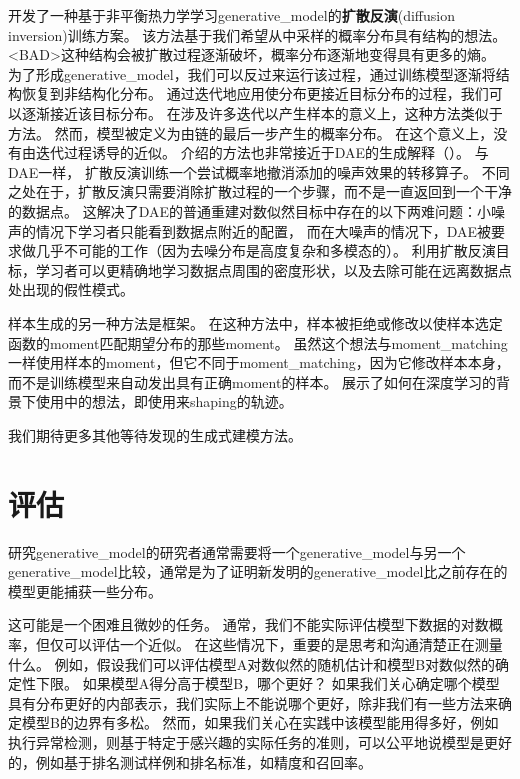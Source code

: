 \citet{Sohl-Dickstein-et-al-ICML2015} 开发了一种基于非平衡热力学学习\gls{generative_model}的\textbf{扩散反演}(diffusion inversion)训练方案。
该方法基于我们希望从中采样的概率分布具有结构的想法。
<BAD>这种结构会被扩散过程逐渐破坏，概率分布逐渐地变得具有更多的熵。
为了形成\gls{generative_model}，我们可以反过来运行该过程，通过训练模型逐渐将结构恢复到非结构化分布。
通过迭代地应用使分布更接近目标分布的过程，我们可以逐渐接近该目标分布。
在涉及许多迭代以产生样本的意义上，这种方法类似于方法。
然而，模型被定义为由链的最后一步产生的概率分布。
在这个意义上，没有由迭代过程诱导的近似。
\citet{Sohl-Dickstein-et-al-ICML2015} 介绍的方法也非常接近于\gls{DAE}的生成解释（）。
与\gls{DAE}一样， 扩散反演训练一个尝试概率地撤消添加的噪声效果的转移算子。
不同之处在于，扩散反演只需要消除扩散过程的一个步骤，而不是一直返回到一个干净的数据点。
这解决了\gls{DAE}的普通重建对数似然目标中存在的以下两难问题：小噪声的情况下学习者只能看到数据点附近的配置， 而在大噪声的情况下，\gls{DAE}被要求做几乎不可能的工作（因为去噪分布是高度复杂和多模态的）。
利用扩散反演目标，学习者可以更精确地学习数据点周围的密度形状，以及去除可能在远离数据点处出现的假性模式。

样本生成的另一种方法是框架\citep{rubin1984bayesianly}。
在这种方法中，样本被拒绝或修改以使样本选定函数的\gls{moment}匹配期望分布的那些\gls{moment}。
虽然这个想法与\gls{moment_matching}一样使用样本的\gls{moment}，但它不同于\gls{moment_matching}，因为它修改样本本身，而不是训练模型来自动发出具有正确\gls{moment}的样本。
\citet{BachmanP15} 展示了如何在深度学习的背景下使用中的想法，即使用来\gls{shaping}的轨迹。

我们期待更多其他等待发现的生成式建模方法。


\section{评估}
\label{sec:evaluating_generative_models}

研究\gls{generative_model}的研究者通常需要将一个\gls{generative_model}与另一个\gls{generative_model}比较，通常是为了证明新发明的\gls{generative_model}比之前存在的模型更能捕获一些分布。

这可能是一个困难且微妙的任务。
通常，我们不能实际评估模型下数据的对数概率，但仅可以评估一个近似。
在这些情况下，重要的是思考和沟通清楚正在测量什么。
例如，假设我们可以评估模型A对数似然的随机估计和模型B对数似然的确定性下限。
如果模型A得分高于模型B，哪个更好？
如果我们关心确定哪个模型具有分布更好的内部表示，我们实际上不能说哪个更好，除非我们有一些方法来确定模型B的边界有多松。
然而，如果我们关心在实践中该模型能用得多好，例如执行异常检测，则基于特定于感兴趣的实际任务的准则，可以公平地说模型是更好的，例如基于排名测试样例和排名标准，如精度和召回率。

